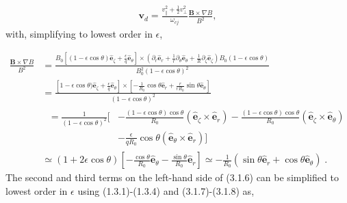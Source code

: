 \documentclass[12pt]{article}
\numberwithin{equation}{subsection}
\begin{document}
   \begin{equation}
   \begin{aligned}
      \bm{v}_d = \frac{v_\parallel^2 + \frac{1}{2} v_\perp^2}{\omega_{cj}}\frac{\bm{B}\times\nabla B}{B^2},
   \end{aligned}
   \end{equation}
with, simplifying to lowest order in $\epsilon$,
   
   \begin{equation}
   \begin{aligned}
      \frac{\bm{B}\times\nabla B}{B^2} &= \frac{B_0[(1-\epsilon\cos\theta)\bm{\hat{e}}_\zeta + \frac{\epsilon}{q}\bm{\hat{e}}_\theta]
      \times(\partial_r\bm{\hat{e}}_r + \frac{1}{r}\partial_\theta\bm{\hat{e}}_\theta + \frac{1}{R}\partial_\zeta\bm{\hat{e}}_\zeta)
      B_0(1-\epsilon\cos\theta)}{B_0^2(1-\epsilon\cos\theta)^2} \\ &=
      \frac{[1-\epsilon\cos\theta)\bm{\hat{e}}_\zeta + \frac{\epsilon}{q}\bm{\hat{e}}_\theta]
      \times[-\frac{1}{R_0}\cos\theta\bm{\hat{e}}_r + \frac{r}{r R_0}\sin\theta\bm{\hat{e}}_\theta]}{(1-\epsilon\cos\theta)^2} \\ &
      \begin{aligned}
         \;= \frac{1}{(1-\epsilon\cos\theta)^2}[&-\frac{(1-\epsilon\cos\theta)\cos\theta}{R_0}(\bm{\hat{e}}_\zeta\times\bm{\hat{e}}_r)
                                                 -\frac{(1-\epsilon\cos\theta)\cos\theta}{R_0}(\bm{\hat{e}}_\zeta\times\bm{\hat{e}}_\theta) \\
                                                &-\frac{\epsilon}{q R_0}\cos\theta(\bm{\hat{e}}_\theta\times\bm{\hat{e}}_r)]
      \end{aligned}         
      \\ &\simeq (1+2\epsilon\cos\theta)[-\frac{\cos\theta}{R_0}\bm{\hat{e}}_\theta-\frac{\sin\theta}{R_0}\bm{\hat{e}}_r]
          \simeq -\frac{1}{R_0}(\sin\theta\bm{\hat{e}}_r + \cos\theta\bm{\hat{e}}_\theta)\;.
   \end{aligned}
   \end{equation}
The second and third terms on the left-hand side of (3.1.6) can be simplified to lowest order in $\epsilon$ using (1.3.1)-(1.3.4) and
(3.1.7)-(3.1.8) as,
   
\end{document}
